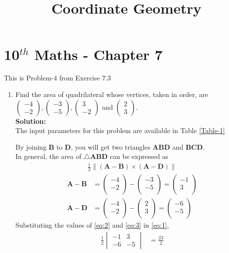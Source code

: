 \documentclass[12pt]{article}
\newcommand{\mydet}[1]{\ensuremath{\begin{vmatrix}#1\end{vmatrix}}}
\providecommand{\brak}[1]{\ensuremath{\left(#1\right)}}
\providecommand{\norm}[1]{\left\lVert#1\right\rVert}
\newcommand{\solution}{\noindent \textbf{Solution: }}
\newcommand{\myvec}[1]{\ensuremath{\begin{pmatrix}#1\end{pmatrix}}}
\let\vec\mathbf
\begin{document}
\begin{center}
\title{\textbf{Coordinate Geometry}}
\date{\vspace{-5ex}} %
\maketitle
\end{center}
\setcounter{page}{1}
\section*{10$^{th}$ Maths - Chapter 7}
This is Problem-4 from Exercise 7.3
\begin{enumerate}
\item Find the area of quadrilateral whose vertices, taken in order, are $\myvec{-4 \\ -2}, \myvec{-3\\-5}, \myvec{3\\-2}$ and $\myvec{2\\3}$.\\
\solution \\The input parameters for this problem are available in Table \eqref{Table-1}
\begin{table}[ht!]

\caption{}
\label{Table-1} 
\end{table}
By joining $\vec{B}$ to $\vec{D}$, you will get two triangles $\vec{A}\vec{B}\vec{D}$ and $\vec{B}\vec{C}\vec{D}$.\\
In general, the area of $\triangle \vec{A}\vec{B}\vec{D}$ can be expressed as
  \begin{align}
  \frac{1}{2} \norm{\brak{\vec{A}-\vec{B}}  \times 
   \brak{\vec{A}- \vec{D}}} \label{eq:1} 
\end{align}
\begin{align}
	\vec{A}- \vec{B} &= \myvec{-4\\-2\\}-\myvec{-3\\-5\\}=\myvec{-1\\3\\}\label{eq:2}\\
	  \vec{A}- \vec{D} &= \myvec{-4\\-2\\}-\myvec{2\\3\\}=\myvec{-6\\-5\\}\label{eq:3}
  \end{align}
Substituting the values of \eqref{eq:2} and \eqref{eq:3} in \eqref{eq:1},
\begin{align}
	\frac{1}{2}\mydet{-1 & 3\\-6 & -5}  
	&=	\frac{23}{2}
\end{align}


\end{enumerate}
\end{document}
